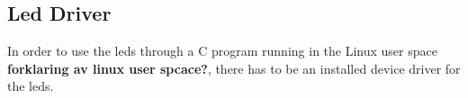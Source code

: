 \subsection{Led Driver}
In order to use the leds through a C program running in the Linux 
user space \textbf{forklaring av linux user spcace?}, there has
to be an installed device driver for the leds. 